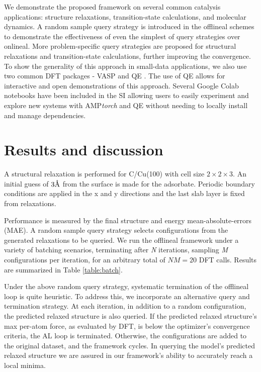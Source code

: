 \documentclass[%
 reprint,
 amsmath,amssymb,
 aps,
]{revtex4-2}
\newcommand{\ang}{\mbox{\normalfont\AA}}
\begin{document}
We demonstrate the proposed framework on several common catalysis applications: structure relaxations, transition-state calculations, and molecular dynamics. A random sample query strategy is introduced in the \gls{offlineal} schemes to demonstrate the effectiveness of even the simplest of query strategies over \gls{onlineal}. More problem-specific query strategies are proposed for structural relaxations and transition-state calculations, further improving the convergence. To show the generality of this approach in small-data applications, we also use two common \gls{DFT} packages - \gls{VASP} and \gls{QE} \cite{Kresse1993,Kresse1996, Giannozzi2009}. The use of \gls{QE} allows for interactive and open demonstrations of this approach.  Several Google Colab notebooks have been included in the \gls{SI} allowing users to easily experiment and explore new systems with AMP\textit{torch} and \gls{QE} without needing to locally install and manage dependencies.



\section{Results and discussion}
A structural relaxation is performed for C/Cu(100) with cell size $2\times2\times3$. An initial guess of $3\ang$ from the surface is made for the adsorbate. Periodic boundary conditions are applied in the x and y directions and the last slab layer is fixed from relaxations. 

Performance is measured by the final structure and energy mean-absolute-errors (MAE). A random sample query strategy selects configurations from the generated relaxations to be queried. We run the \gls{offlineal} framework under a variety of batching scenarios, terminating after \textit{N} iterations, sampling \textit{M} configurations per iteration, for an arbitrary total of $NM = 20$ DFT calls. Results are summarized in Table \ref{table:batch}.

Under the above random query strategy, systematic termination of the \gls{offlineal} loop is quite heuristic. To address this, we incorporate an alternative query and termination strategy. At each iteration, in addition to a random configuration, the predicted relaxed structure is also queried. If the predicted relaxed structure's max per-atom force, as evaluated by DFT, is below the optimizer's convergence criteria, the AL loop is terminated. Otherwise, the configurations are added to the original dataset, and the framework cycles. In querying the model's predicted relaxed structure we are assured in our framework's ability to accurately reach a local minima. 
\end{document}
